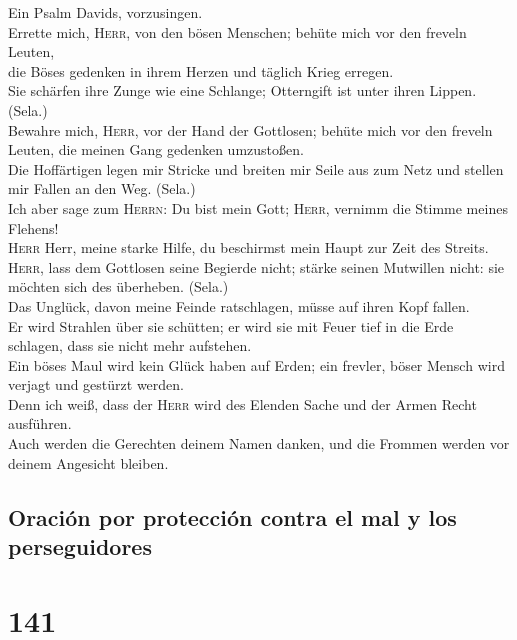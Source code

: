  Ein Psalm Davids, vorzusingen.\\
 Errette mich, \textsc{Herr}, von den bösen Menschen;
behüte mich vor den freveln Leuten,\\
 die Böses gedenken in ihrem Herzen und täglich Krieg
erregen.\\
 Sie schärfen ihre Zunge wie eine Schlange; Otterngift ist
unter ihren Lippen. (Sela.)\\
 Bewahre mich, \textsc{Herr}, vor der Hand der Gottlosen;
behüte mich vor den freveln Leuten, die meinen Gang gedenken
umzustoßen.\\
 Die Hoffärtigen legen mir Stricke und breiten mir Seile
aus zum Netz und stellen mir Fallen an den Weg. (Sela.)\\
 Ich aber sage zum \textsc{Herrn}: Du bist mein Gott;
\textsc{Herr}, vernimm die Stimme meines Flehens!\\
 \textsc{Herr} Herr, meine starke Hilfe, du beschirmst
mein Haupt zur Zeit des Streits.\\
 \textsc{Herr}, lass dem Gottlosen seine Begierde nicht;
stärke seinen Mutwillen nicht: sie möchten sich des überheben. (Sela.)\\
 Das Unglück, davon meine Feinde ratschlagen, müsse auf
ihren Kopf fallen.\\
 Er wird Strahlen über sie schütten; er wird sie mit
Feuer tief in die Erde schlagen, dass sie nicht mehr aufstehen.\\
 Ein böses Maul wird kein Glück haben auf Erden; ein
frevler, böser Mensch wird verjagt und gestürzt werden.\\
 Denn ich weiß, dass der \textsc{Herr} wird des Elenden
Sache und der Armen Recht ausführen.\\
 Auch werden die Gerechten deinem Namen danken, und die
Frommen werden vor deinem Angesicht bleiben.

\hypertarget{oraciuxf3n-por-protecciuxf3n-contra-el-mal-y-los-perseguidores}{%
\subsection{Oración por protección contra el mal y los
perseguidores}\label{oraciuxf3n-por-protecciuxf3n-contra-el-mal-y-los-perseguidores}}

\hypertarget{section-140}{%
\section{141}\label{section-140}}

